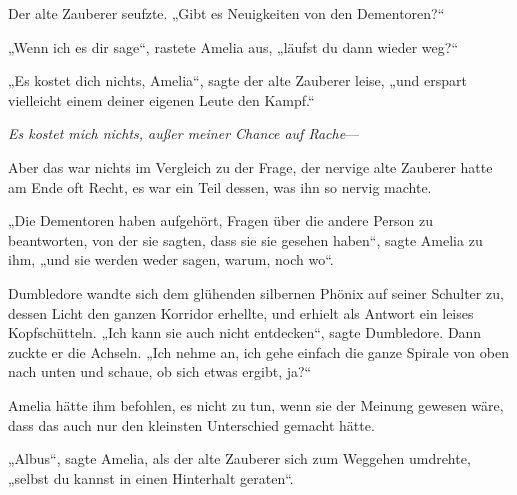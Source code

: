 Der alte Zauberer seufzte.
„Gibt es Neuigkeiten von den Dementoren?“

„Wenn ich es dir sage“, rastete Amelia aus, „läufst du dann wieder weg?“

„Es kostet dich nichts, Amelia“, sagte der alte Zauberer leise, „und erspart vielleicht einem deiner eigenen Leute den Kampf.“

\emph{Es kostet mich nichts, außer meiner Chance auf Rache}—

Aber das war nichts im Vergleich zu der Frage, der nervige alte Zauberer hatte am Ende oft Recht, es war ein Teil dessen, was ihn so nervig machte.

„Die Dementoren haben aufgehört, Fragen über die andere Person zu beantworten, von der sie sagten, dass sie sie gesehen haben“, sagte Amelia zu ihm, „und sie werden weder sagen, warum, noch wo“.

Dumbledore wandte sich dem glühenden silbernen Phönix auf seiner Schulter zu, dessen Licht den ganzen Korridor erhellte, und erhielt als Antwort ein leises Kopfschütteln.
„Ich kann sie auch nicht entdecken“, sagte Dumbledore. Dann zuckte er die Achseln.
„Ich nehme an, ich gehe einfach die ganze Spirale von oben nach unten und schaue, ob sich etwas ergibt, ja?“

Amelia hätte ihm befohlen, es nicht zu tun, wenn sie der Meinung gewesen wäre, dass das auch nur den kleinsten Unterschied gemacht hätte.

„Albus“, sagte Amelia, als der alte Zauberer sich zum Weggehen umdrehte, „selbst du kannst in einen Hinterhalt geraten“.

